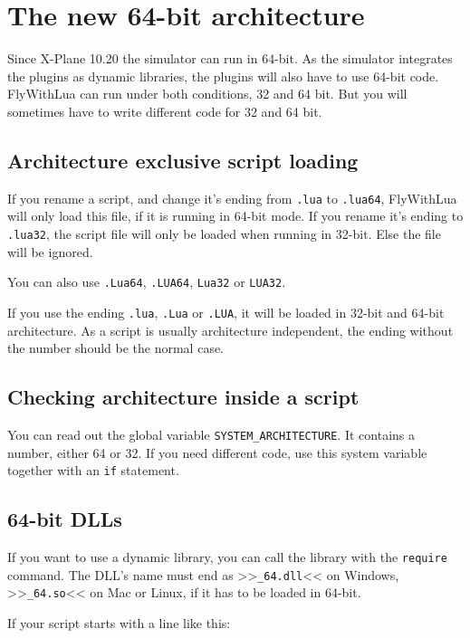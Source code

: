 \documentclass[11pt,parskip=half,a4paper]{scrartcl}
\begin{document}
\newpage
\section{The new 64-bit architecture}

Since X-Plane 10.20 the simulator can run in 64-bit. As the simulator integrates the plugins as dynamic libraries, the plugins will also have to use 64-bit code. FlyWithLua can run under both conditions, 32 and 64 bit. But you will sometimes have to write different code for 32 and 64 bit.

\subsection{Architecture exclusive script loading}

If you rename a script, and change it's ending from \verb|.lua| to \verb|.lua64|, FlyWithLua will only load this file, if it is running in 64-bit mode. If you rename it's ending to \verb|.lua32|, the script file will only be loaded when running in 32-bit. Else the file will be ignored.

You can also use \verb|.Lua64|, \verb|.LUA64|, \verb|Lua32| or \verb|LUA32|.

If you use the ending \verb|.lua|, \verb|.Lua| or \verb|.LUA|, it will be loaded in 32-bit and 64-bit architecture. As a script is usually architecture independent, the ending without the number should be the normal case.

\subsection{Checking architecture inside a script}

You can read out the global variable \verb|SYSTEM_ARCHITECTURE|. It contains a number, either 64 or 32. If you need different code, use this system variable together with an \verb|if| statement.

\subsection{64-bit DLLs}

If you want to use a dynamic library, you can call the library with the \verb|require| command. The DLL's name must end as >>\verb|_64.dll|<< on Windows, >>\verb|_64.so|<< on Mac or Linux, if it has to be loaded in 64-bit.

If your script starts with a line like this:
\end{document}
